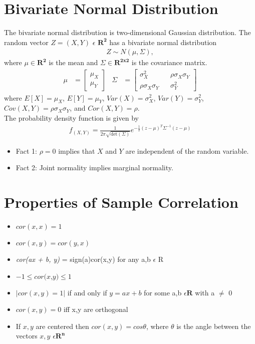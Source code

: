 \documentclass[11pt]{article}
\begin{document}
\section{Bivariate Normal Distribution}
The bivariate normal distribution is two-dimensional Gaussian distribution. The random vector $Z = (X,Y)$ $\epsilon$ $\mathbf{R^2}$ has a bivariate normal distribution
\begin{align}
Z \sim N(\mu, \Sigma),
\end{align}
where $\mu \in \mathbf{R^2}$ is the mean and $\Sigma \in \mathbf{R^{2x2}}$ is the covariance matrix.\\
\begin{align}
\mu &= \begin{bmatrix}\mu_X \\ \mu_Y\end{bmatrix} &
\Sigma &= \begin{bmatrix}\sigma^2_X && \rho\sigma_X\sigma_Y \\ \rho\sigma_X\sigma_Y && \sigma^2_Y \end{bmatrix}
\end{align}
where $E[X] = \mu_X$, $E[Y] = \mu_Y$, $Var(X)=\sigma^2_X$, $Var(Y)=\sigma^2_Y$, $Cov(X,Y)=\rho\sigma_X\sigma_Y$, and $Cor(X,Y)=\rho$.\\

The probability density function is given by
\begin{align}
f_(X,Y) = \frac{1}{2\pi\sqrt{\text{det}(\Sigma)}}e^{-\frac{1}{2}(z-\mu)^T\Sigma^{-1}(z-\mu)}
\end{align}

\begin{itemize}
\item Fact 1: $\rho = 0$ implies that $X$ and $Y$ are independent of the random variable.
\item Fact 2: Joint normality implies marginal normality.
\end{itemize}

\section{Properties of Sample Correlation}

\begin{itemize}
\item $cor(x,x) = 1$
\item $cor(x,y) = cor(y,x)$
\item \textit{cor(ax + b, y)} = sign(a)cor(x,y) for any a,b $\epsilon$ R
\item $-1 \leq \textit{cor(x,y)}  \leq 1 $
\item $|cor(x,y)  =  1|$ if and only if $y = ax + b$ for some a,b $\epsilon \mathbf{R}$ with a $\neq$ 0
\item $cor(x,y) = 0$ iff x,y are orthogonal
\item If $x,y$ are centered then $cor(x,y) = cos\theta$, where $\theta$ is the angle between the vectors $x,y$ $\epsilon \mathbf{R^n}$ 



\end{itemize}
\end{document}
